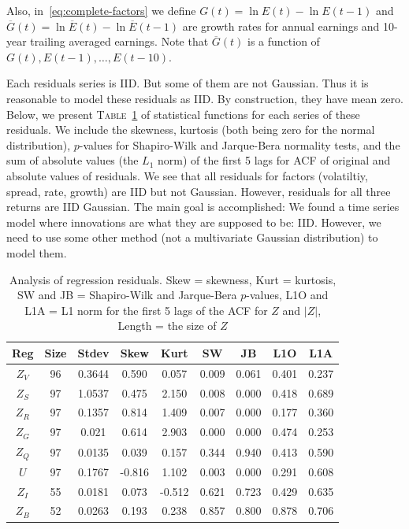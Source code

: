 \documentclass[12pt]{amsart}
\begin{document}
Also, in~\eqref{eq:complete-factors} we define $G(t) = \ln E(t) - \ln E(t-1)$ and $\overline{G}(t) = \ln\overline{E}(t) - \ln\overline{E}(t-1)$ are growth rates for annual earnings and 10-year trailing averaged earnings. Note that $\overline{G}(t)$ is a function of $G(t), E(t-1), \ldots, E(t-10)$. 

Each residuals series is IID. But some of them are not Gaussian. Thus it is reasonable to model these residuals as IID. By construction, they have mean zero. Below, we present \textsc{Table}~\ref{table:residuals} of statistical functions for each series of these residuals. We include the skewness, kurtosis (both being zero for the normal distribution), $p$-values for Shapiro-Wilk and Jarque-Bera normality tests, and the sum of absolute values (the $L_1$ norm) of the first 5 lags for ACF of original and absolute values of residuals. We see that all residuals for factors (volatiltiy, spread, rate, growth) are IID but not Gaussian. However, residuals for all three returns are IID Gaussian. The main goal is accomplished: We found a time series model where innovations are what they are supposed to be: IID. However, we need to use some other method (not a multivariate Gaussian distribution) to model them. 

\begin{table}[ht]
\centering
\begin{tabular}{|c|cccccccc|}
\hline
Reg & Size & Stdev & Skew & Kurt & SW & JB & L1O & L1A \\
\hline
$Z_V$ & 96 &  0.3644 & 0.590 & 0.057 & 0.009 & 0.061 & 0.401 & 0.237 \\
$Z_S$ & 97 & 1.0537 & 0.475 & 2.150 & 0.008 & 0.000 & 0.418 & 0.689 \\
$Z_R$ & 97 & 0.1357 & 0.814 & 1.409 & 0.007 & 0.000 & 0.177 & 0.360 \\
$Z_G$ & 97 & 0.021 & 0.614 & 2.903 & 0.000 & 0.000 & 0.474 & 0.253 \\
$Z_Q$ & 97 & 0.0135 & 0.039 & 0.157 & 0.344 & 0.940 & 0.413 & 0.590 \\
$U$ & 97 & 0.1767 & -0.816 & 1.102 & 0.003 & 0.000 & 0.291 & 0.608 \\
$Z_I$ & 55 & 0.0181 & 0.073 & -0.512 & 0.621 & 0.723 & 0.429 & 0.635 \\
$Z_B$ & 52 & 0.0263 & 0.193 & 0.238 & 0.857 & 0.800 & 0.878 & 0.706 \\
\hline
\end{tabular}
\caption{Analysis of regression residuals. Skew = skewness, Kurt = kurtosis, SW and JB =  Shapiro-Wilk and Jarque-Bera $p$-values, L1O and L1A = L1 norm for the first 5 lags of the ACF for $Z$ and $|Z|$, Length = the size of $Z$}
\label{table:residuals}
\end{table}
\end{document}
